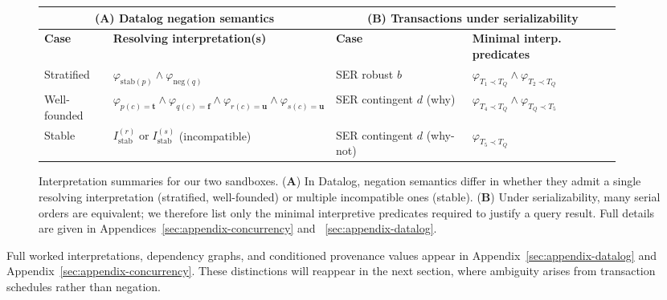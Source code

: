 \documentclass[acmsmall,nonacm]{acmart}
\theoremstyle{remark}
\numberwithin{definition}{section}
\numberwithin{theorem}{section}
\numberwithin{lemma}{section}
\numberwithin{corollary}{section}
\numberwithin{remark}{section}
\numberwithin{example}{section}
\numberwithin{observation}{section}
\numberwithin{assumption}{section}
\begin{document}
\begin{figure}[t]
\centering
\footnotesize
\setlength{\tabcolsep}{6pt}
\renewcommand{\arraystretch}{1.15}

\begin{tabular}{
@{}p{0.12\linewidth} p{0.30\linewidth} || 
   p{0.24\linewidth} p{0.26\linewidth}@{}
}
\toprule
\multicolumn{2}{c||}{\textbf{(A) Datalog negation semantics}} &
\multicolumn{2}{c}{\textbf{(B) Transactions under serializability}} \\
\midrule
\textbf{Case} & \textbf{Resolving interpretation(s)} &
\textbf{Case} & \textbf{Minimal interp. predicates} \\
\midrule
Stratified &
$\varphi_{\mathrm{stab}(p)} \wedge \varphi_{\mathrm{neg}(q)}$ &
SER robust $b$ &
$\varphi_{T_1 \prec T_Q} \wedge \varphi_{T_2 \prec T_Q}$ \\
%
Well-founded &
$\varphi_{p(c)=\mathbf{t}} \wedge
 \varphi_{q(c)=\mathbf{f}} \wedge
 \varphi_{r(c)=\mathbf{u}} \wedge
 \varphi_{s(c)=\mathbf{u}}$ &
SER contingent $d$ (why) &
$\varphi_{T_4 \prec T_Q} \wedge \varphi_{T_Q \prec T_5}$ \\
%
Stable &
$I_{\mathrm{stab}}^{(r)} \;\text{or}\;
I_{\mathrm{stab}}^{(s)}$ (incompatible) &
SER contingent $d$ (why-not) &
$\varphi_{T_5 \prec T_Q}$ \\
\bottomrule
\end{tabular}

\caption{
Interpretation summaries for our two sandboxes.
(\textbf{A}) In Datalog, negation semantics differ in whether they admit a single
resolving interpretation (stratified, well-founded) or multiple incompatible ones
(stable).
(\textbf{B}) Under serializability, many serial orders are equivalent; we therefore
list only the minimal interpretive predicates required to justify a query result. 
Full details are given in Appendices~\ref{sec:appendix-concurrency} and ~\ref{sec:appendix-datalog}.
}
\label{fig:interp-tables}
\end{figure}

Full worked interpretations, dependency graphs, and conditioned provenance values
appear in Appendix~\ref{sec:appendix-datalog} and Appendix~\ref{sec:appendix-concurrency}.
These distinctions will reappear in the next section, where ambiguity arises from
transaction schedules rather than negation.
\end{document}
